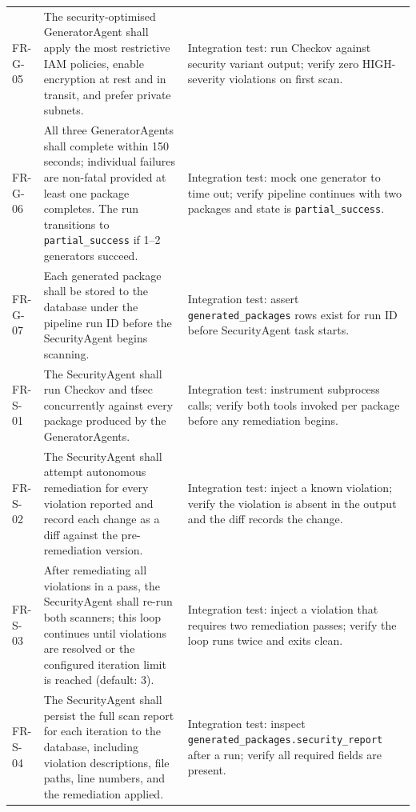 \begin{longtable}{@{}p{}p{}p{}@{}}
FR-G-05 & The security-optimised GeneratorAgent shall apply the most
  restrictive IAM policies, enable encryption at rest and in transit,
  and prefer private subnets. &
  Integration test: run Checkov against security variant output; verify
  zero HIGH-severity violations on first scan. \\

FR-G-06 & All three GeneratorAgents shall complete within 150 seconds;
  individual failures are non-fatal provided at least one package
  completes. The run transitions to \texttt{partial\_success} if 1--2
  generators succeed. &
  Integration test: mock one generator to time out; verify pipeline
  continues with two packages and state is \texttt{partial\_success}. \\

FR-G-07 & Each generated package shall be stored to the database under the
  pipeline run ID before the SecurityAgent begins scanning. &
  Integration test: assert \texttt{generated\_packages} rows exist for
  run ID before SecurityAgent task starts. \\

\midrule

FR-S-01 & The SecurityAgent shall run Checkov and tfsec concurrently
  against every package produced by the GeneratorAgents. &
  Integration test: instrument subprocess calls; verify both tools
  invoked per package before any remediation begins. \\

FR-S-02 & The SecurityAgent shall attempt autonomous remediation for every
  violation reported and record each change as a diff against the
  pre-remediation version. &
  Integration test: inject a known violation; verify the violation is
  absent in the output and the diff records the change. \\

FR-S-03 & After remediating all violations in a pass, the SecurityAgent
  shall re-run both scanners; this loop continues until violations are
  resolved or the configured iteration limit is reached (default: 3). &
  Integration test: inject a violation that requires two remediation
  passes; verify the loop runs twice and exits clean. \\

FR-S-04 & The SecurityAgent shall persist the full scan report for each
  iteration to the database, including violation descriptions, file
  paths, line numbers, and the remediation applied. &
  Integration test: inspect \texttt{generated\_packages.security\_report}
  after a run; verify all required fields are present. \\


\end{longtable}

